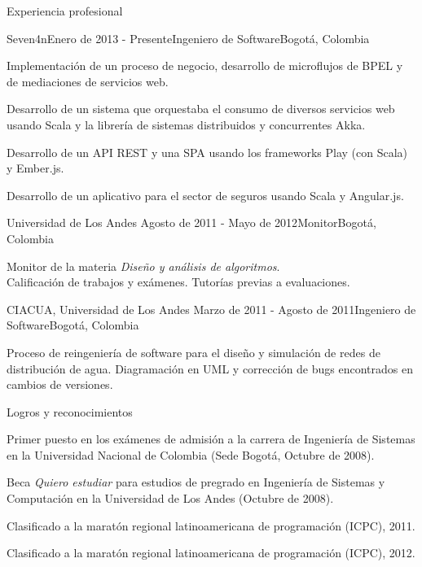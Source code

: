 \documentclass{resume} %
\def\uniandes{Universidad de Los Andes }
\begin{document}
\begin{rSection}{Experiencia profesional}

\begin{rSubsection}{Seven4n}{Enero de 2013 - Presente}{Ingeniero de Software}{Bogot\'a, Colombia}
\item Implementaci\'on de un proceso de negocio, desarrollo de microflujos de BPEL y de mediaciones de servicios web.
\item Desarrollo de un sistema que orquestaba el consumo de diversos servicios web usando Scala y la librer\'ia de sistemas distribuidos y concurrentes Akka.
\item Desarrollo de un API REST y una SPA usando los frameworks Play (con Scala) y Ember.js. 
\item Desarrollo de un aplicativo para el sector de seguros usando Scala y Angular.js.
\end{rSubsection}


\begin{rSubsection}{\uniandes}{Agosto de 2011 - Mayo de 2012}{Monitor}{Bogot\'a, Colombia}
\item Monitor de la materia \textit{Dise\~{n}o y an\'alisis de algoritmos}.\\
Calificaci\'on de trabajos y ex\'amenes. Tutor\'ias previas a evaluaciones.
\end{rSubsection}


\begin{rSubsection}{CIACUA, \uniandes}{Marzo de 2011 - Agosto de 2011}{Ingeniero de Software}{Bogot\'a, Colombia}
\item Proceso de reingenier\'ia de software para el dise\~{n}o y simulaci\'on de redes de distribuci\'on de agua. Diagramaci\'on en UML y correcci\'on de bugs encontrados en cambios de versiones.
\end{rSubsection}

\end{rSection}

\begin{rSection}{Logros y reconocimientos}
\begin{rSubsection}{}{}{}{}
\item Primer puesto en los ex\'amenes de admisi\'on a la carrera de Ingenier\'ia de Sistemas en la Universidad Nacional de Colombia (Sede Bogot\'a, Octubre de 2008).
\item Beca \textsl{Quiero estudiar} para estudios de pregrado en Ingenier\'ia de Sistemas y Computaci\'on en la Universidad de Los Andes (Octubre de 2008).
\item Clasificado a la marat\'on regional latinoamericana de programaci\'on (ICPC), 2011.
\item Clasificado a la marat\'on regional latinoamericana de programaci\'on (ICPC), 2012.
\end{rSubsection}
\end{rSection}
\end{document}
